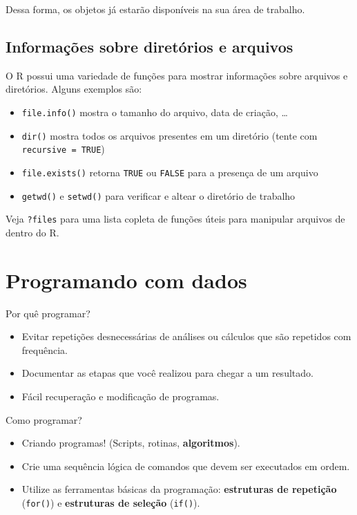 \documentclass[
  10pt,
  a4paper]{book}
\providecommand{\tightlist}{%
  \setlength{\itemsep}{0pt}\setlength{\parskip}{0pt}}
\begin{document}
Dessa forma, os objetos já estarão disponíveis na sua área de
trabalho.

\hypertarget{informauxe7uxf5es-sobre-diretuxf3rios-e-arquivos}{%
\section{Informações sobre diretórios e arquivos}\label{informauxe7uxf5es-sobre-diretuxf3rios-e-arquivos}}

O R possui uma variedade de funções para mostrar informações sobre
arquivos e diretórios. Alguns exemplos são:

\begin{itemize}
\tightlist
\item
  \texttt{file.info()} mostra o tamanho do arquivo, data de criação, \ldots{}
\item
  \texttt{dir()} mostra todos os arquivos presentes em um diretório (tente com
  \texttt{recursive\ =\ TRUE})
\item
  \texttt{file.exists()} retorna \texttt{TRUE} ou \texttt{FALSE} para a presença de um
  arquivo
\item
  \texttt{getwd()} e \texttt{setwd()} para verificar e altear o diretório de trabalho
\end{itemize}

Veja \texttt{?files} para uma lista copleta de funções úteis para manipular
arquivos de dentro do R.

\hypertarget{programando-com-dados}{%
\chapter{Programando com dados}\label{programando-com-dados}}

Por quê programar?

\begin{itemize}
\tightlist
\item
  Evitar repetições desnecessárias de análises ou cálculos que são
  repetidos com frequência.
\item
  Documentar as etapas que você realizou para chegar a um
  resultado.
\item
  Fácil recuperação e modificação de programas.
\end{itemize}

Como programar?

\begin{itemize}
\tightlist
\item
  Criando programas! (Scripts, rotinas, \textbf{algoritmos}).
\item
  Crie uma sequência lógica de comandos que devem ser executados
  em ordem.
\item
  Utilize as ferramentas básicas da programação: \textbf{estruturas de
  repetição} (\texttt{for()}) e \textbf{estruturas de seleção} (\texttt{if()}).
\end{itemize}
\end{document}
